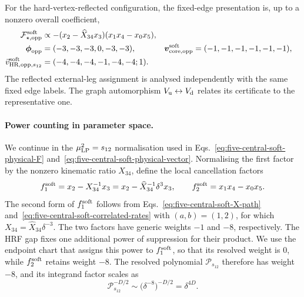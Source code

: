 \documentclass[a4paper,11pt]{article}
\begin{document}
For the hard-vertex-reflected configuration, the fixed-edge presentation is,
up to a nonzero overall coefficient,
\begin{align}
 \mathcal F_{\star,\mathrm{opp}}^{\rm soft}
 &\propto -(x_2-\widehat X_{34}x_3)(x_1x_4-x_0x_5),
 \nonumber\\
 \boldsymbol\phi_{\mathrm{opp}}
 &=(-3,-3,-3,0,-3,-3),
 &
 \boldsymbol v_{\rm core,opp}^{\rm soft}
 &=(-1,-1,-1,-1,-1,-1),
 \nonumber\\
 \vec v_{\mathrm{HR,opp},s_{12}}^{\rm soft}
 &=(-4,-4,-4,-1,-4,-4;1).
 \label{eq:five-central-soft-opposite-vector}
\end{align}
The reflected external-leg assignment is analysed independently with the same
fixed edge labels.  The graph automorphism
\(V_{\rm u}\leftrightarrow V_{\rm d}\) relates its certificate to the
representative one.

\paragraph{Power counting in parameter space.}

We continue in the \(\mu_{\rm LP}^2=s_{12}\) normalisation used in
Eqs.~\eqref{eq:five-central-soft-physical-F}
and~\eqref{eq:five-central-soft-physical-vector}.  Normalising the first
factor by the nonzero kinematic ratio \(X_{34}\), define the local
cancellation factors
\begin{equation}
 f_1^{\rm soft}=x_2-X_{34}^{-1}x_3
 =x_2-\widehat X_{34}^{-1}\delta^3x_3,
 \qquad f_2^{\rm soft}=x_1x_4-x_0x_5.
 \label{eq:five-central-soft-local-cancellation-factors}
\end{equation}
The second form of \(f_1^{\rm soft}\) follows from
Eqs.~\eqref{eq:five-central-soft-X-path}
and~\eqref{eq:five-central-soft-correlated-rates} with \((a,b)=(1,2)\), for
which \(X_{34}=\widehat X_{34}\delta^{-3}\).
The two factors have generic weights \(-1\) and \(-8\), respectively.  The
HRF gap fixes one additional power of suppression for their product.  We use
the endpoint chart that assigns this power to \(f_1^{\rm soft}\), so that its
resolved weight is \(0\), while \(f_2^{\rm soft}\) retains weight \(-8\).
The resolved polynomial \(\mathcal P_{s_{12}}\) therefore has weight
\(-8\), and its integrand factor scales as
\begin{equation}
 \mathcal P_{s_{12}}^{-D/2}
 \sim\bigl(\delta^{-8}\bigr)^{-D/2}=\delta^{4D}.
 \label{eq:five-central-soft-integrand-power}
\end{equation}
\end{document}
